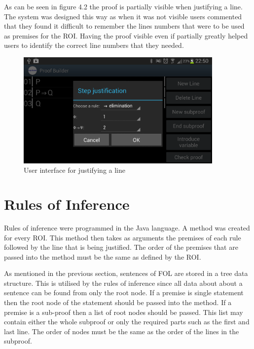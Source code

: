 As can be seen in figure 4.2 the proof is partially visible when justifying a line. The system was designed this way as when it was not visible users commented that they found it difficult to remember the lines numbers that were to be used as premises for the ROI. Having the proof visible even if partially greatly helped users to identify the correct line numbers that they needed.

	
\begin{figure}[h!]
\centering
\includegraphics[width=0.9\textwidth]{Images/justification.png}
\caption{User interface for justifying a line}
\label{fig:Compilation}
\end{figure}

\FloatBarrier


\section{Rules of Inference}

Rules of inference were programmed in the Java language. A method was created for every ROI. This method then takes as arguments the premises of each rule followed by the line that is being justified. The order of the premises that are passed into the method must be the same as defined by the ROI. 

As mentioned in the previous section, sentences of FOL are stored in a tree data structure. This is utilised by the rules of inference since all data about about a sentence can be found from only the root node. If a premise is single statement then the root node of the statement should be passed into the method. If a premise is a sub-proof then a list of root nodes should be passed. This list may contain either the whole subproof or only the required parts such as the first and last line. The order of nodes must be the same as the order of the lines in the subproof.  

